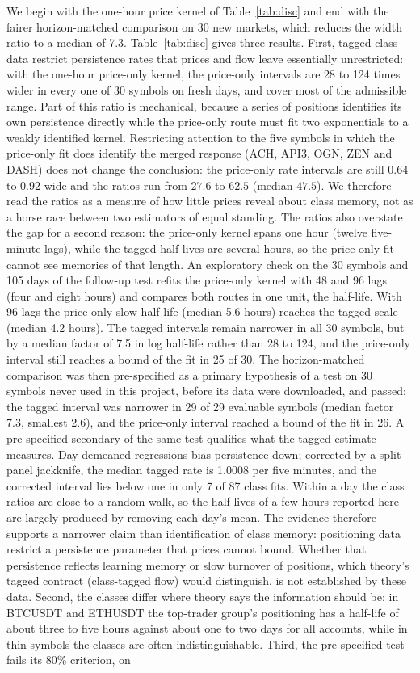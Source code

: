 We begin with the one-hour price kernel of Table~\ref{tab:disc} and end with the fairer horizon-matched comparison on 30 new markets, which reduces the width ratio to a median of 7.3. Table~\ref{tab:disc} gives three results. First, tagged class data restrict persistence rates that prices and flow leave essentially unrestricted: with the one-hour price-only kernel, the price-only intervals are 28 to 124 times wider in every one of 30 symbols on fresh days, and cover most of the admissible range. Part of this ratio is mechanical, because a series of positions identifies its own persistence directly while the price-only route must fit two exponentials to a weakly identified kernel. Restricting attention to the five symbols in which the price-only fit does identify the merged response (ACH, API3, OGN, ZEN and DASH) does not change the conclusion: the price-only rate intervals are still $0.64$ to $0.92$ wide and the ratios run from $27.6$ to $62.5$ (median $47.5$). We therefore read the ratios as a measure of how little prices reveal about class memory, not as a horse race between two estimators of equal standing. The ratios also overstate the gap for a second reason: the price-only kernel spans one hour (twelve five-minute lags), while the tagged half-lives are several hours, so the price-only fit cannot see memories of that length. An exploratory check on the 30 symbols and 105 days of the follow-up test refits the price-only kernel with 48 and 96 lags (four and eight hours) and compares both routes in one unit, the half-life. With 96 lags the price-only slow half-life (median 5.6 hours) reaches the tagged scale (median 4.2 hours). The tagged intervals remain narrower in all 30 symbols, but by a median factor of 7.5 in log half-life rather than 28 to 124, and the price-only interval still reaches a bound of the fit in 25 of 30. The horizon-matched comparison was then pre-specified as a primary hypothesis of a test on 30 symbols never used in this project, before its data were downloaded, and passed: the tagged interval was narrower in 29 of 29 evaluable symbols (median factor 7.3, smallest 2.6), and the price-only interval reached a bound of the fit in 26. A pre-specified secondary of the same test qualifies what the tagged estimate measures. Day-demeaned regressions bias persistence down; corrected by a split-panel jackknife, the median tagged rate is 1.0008 per five minutes, and the corrected interval lies below one in only 7 of 87 class fits. Within a day the class ratios are close to a random walk, so the half-lives of a few hours reported here are largely produced by removing each day's mean. The evidence therefore supports a narrower claim than identification of class memory: positioning data restrict a persistence parameter that prices cannot bound. Whether that persistence reflects learning memory or slow turnover of positions, which theory's tagged contract (class-tagged flow) would distinguish, is not established by these data. Second, the classes differ where theory says the information should be: in BTCUSDT and ETHUSDT the top-trader group's positioning has a half-life of about three to five hours against about one to two days for all accounts, while in thin symbols the classes are often indistinguishable. Third, the pre-specified test fails its 80\% criterion, on 